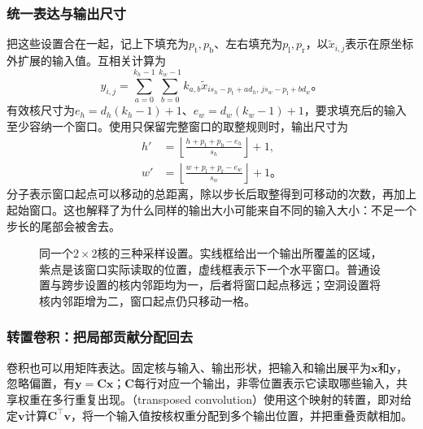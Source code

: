 \subsubsection{统一表达与输出尺寸}
\label{sec:cnn-shape-operation}

把这些设置合在一起，记上下填充为$p_{\mathrm t},p_{\mathrm b}$、左右填充为$p_{\mathrm l},p_{\mathrm r}$，以$\widetilde x_{i,j}$表示在原坐标外扩展的输入值。互相关计算为
\begin{equation}
  y_{i,j}=\sum_{a=0}^{k_h-1}\sum_{b=0}^{k_w-1}
    k_{a,b}\widetilde x_{is_h-p_{\mathrm t}+ad_h,\,
                         js_w-p_{\mathrm l}+bd_w}\text{。}
  \label{eq:cnn-general-correlation}
\end{equation}
有效核尺寸为$e_h=d_h(k_h-1)+1$、$e_w=d_w(k_w-1)+1$，要求填充后的输入至少容纳一个窗口。使用只保留完整窗口的取整规则时，输出尺寸为
\begin{equation}
  \begin{aligned}
    h'&=\left\lfloor\frac{h+p_{\mathrm t}+p_{\mathrm b}-e_h}{s_h}\right\rfloor+1,\\
    w'&=\left\lfloor\frac{w+p_{\mathrm l}+p_{\mathrm r}-e_w}{s_w}\right\rfloor+1\text{。}
  \end{aligned}
  \label{eq:cnn-output-size}
\end{equation}
分子表示窗口起点可以移动的总距离，除以步长后取整得到可移动的次数，再加上起始窗口。这也解释了为什么同样的输出大小可能来自不同的输入大小：不足一个步长的尾部会被舍去。

\begin{figure}[htb]
  \centering
  
  \caption{同一个$2\times2$核的三种采样设置。实线框给出一个输出所覆盖的区域，紫点是该窗口实际读取的位置，虚线框表示下一个水平窗口。普通设置与跨步设置的核内邻距均为一，后者将窗口起点移远；空洞设置将核内邻距增为二，窗口起点仍只移动一格。}
  \label{fig:cnn-sampling}
\end{figure}

\subsubsection{转置卷积：把局部贡献分配回去}
\label{sec:cnn-transpose-operation}

卷积也可以用矩阵表达。固定核与输入、输出形状，把输入和输出展平为$\bm x$和$\bm y$，忽略偏置，有$\bm y=\bm C\bm x$；$\bm C$每行对应一个输出，非零位置表示它读取哪些输入，共享权重在多行重复出现。（transposed convolution）使用这个映射的转置，即对给定$\bm v$计算$\bm C^\top\bm v$，将一个输入值按核权重分配到多个输出位置，并把重叠贡献相加。

